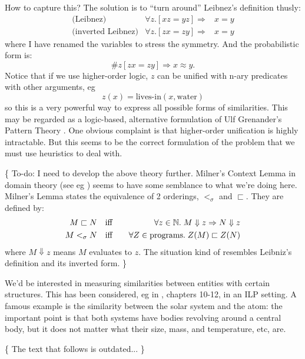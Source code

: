 How to capture this?  The solution is to ``turn around'' Leibnez's definition thusly:
\begin{eqnarray}
\mbox{(Leibnez)}           & \forall z. [x z = y z] \Rightarrow& x = y \\
\mbox{(inverted Leibnez)}  & \forall z. [z x = z y] \Rightarrow& x = y
\label{eqn:inverted-extensionality}
\end{eqnarray}
where I have renamed the variables to stress the symmetry.  And the probabilistic form is:
\begin{equation}
\# z [z x = z y]  \Rightarrow x \approx y.
\end{equation}
Notice that if we use higher-order logic, $z$ can be unified with n-ary predicates with other arguments, eg
 $$z(x) = \mbox{lives-in}(x, \mbox{water})$$
so this is a very powerful way to express all possible forms of similarities.  This may be regarded as a logic-based, alternative formulation of Ulf Grenander's Pattern Theory \citep*{Grenander2007}.  One obvious complaint is that higher-order unification is highly intractable.  But this seems to be the correct formulation of the problem that we must use heuristics to deal with.

\{ To-do:  I need to develop the above theory further.  Milner's Context Lemma in domain theory (see eg \citep*{Streicher2006}) seems to have some semblance to what we're doing here.  Milner's Lemma states the equivalence of 2 orderings, $<_{\sigma}$ and $\sqsubset$.  They are defined by:
\begin{eqnarray}
M \sqsubset N  \quad  &\mbox{iff}& \quad \forall z \in \mathbb{N}. \; M \Downarrow z \Rightarrow N \Downarrow z \\
M <_{\sigma} N \quad  &\mbox{iff}& \quad \forall Z \in \mbox{programs.} \; Z(M) \sqsubset Z(N)
\end{eqnarray}
where $M \Downarrow z$ means $M$ evaluates to $z$.  The situation kind of resembles Leibniz's definition and its inverted form.
\}

We'd be interested in measuring similarities between entities with certain structures.  This has been considered, eg in \citep*{Schmid2003}, chapters 10-12, in an ILP setting.  A famous example is the similarity between the solar system and the atom:  the important point is that both systems have bodies revolving around a central body, but it does not matter what their size, mass, and temperature, etc, are.

\{ The text that follows is outdated... \}
\underconst

